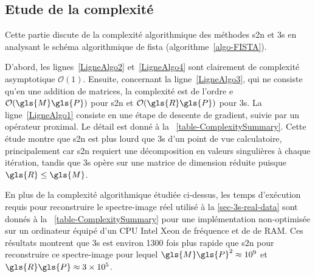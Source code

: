 \subsection{Etude de la complexité}

Cette partie discute de la complexité algorithmique des méthodes \gls{s2n} et \gls{3s} en analysant le schéma algorithmique de \gls{fista} (algorithme~\ref{algo-FISTA}).

D'abord, les lignes~\ref{LigneAlgo2} et~\ref{LigneAlgo4} sont clairement de complexité asymptotique $\mathcal{O}(1)$. Ensuite, concernant la ligne~\ref{LigneAlgo3}, qui ne consiste qu'en une addition de matrices, la complexité est de l'ordre e $\mathcal{O}(\gls{M}\gls{P})$ pour \gls{s2n} et $\mathcal{O}(\gls{R}\gls{P})$ pour \gls{3s}. La ligne~\ref{LigneAlgo1} consiste en une étape de descente de gradient, suivie par un opérateur proximal. Le détail est donné à la \tabname~\ref{table-ComplexitySummary}. Cette étude montre que \gls{s2n} est plus lourd que \gls{3s} d'un point de vue calculatoire, principalement car \gls{s2n} requiert une décomposition en valeurs singulières à chaque itération, tandis que \gls{3s} opère sur une matrice de dimension réduite puisque $\gls{R} \leq \gls{M}$.

En plus de la complexité algorithmique étudiée ci-dessus, les temps d'exécution requis pour reconstruire le spectre-image réel utilisé à la \cref{sec-3s-real-data} sont donnés à la \tabname~\ref{table-ComplexitySummary} pour une implémentation non-optimisée sur un ordinateur équipé d'un CPU Intel Xeon de fréquence  et de  de RAM. Ces résultats montrent que \gls{3s} est environ 1300 fois plus rapide que \gls{s2n} pour reconstruire ce spectre-image pour lequel $\gls{M}\gls{P}^2 \approx 10^9$ et $\gls{R}\gls{P} \approx 3\times 10^5$.

